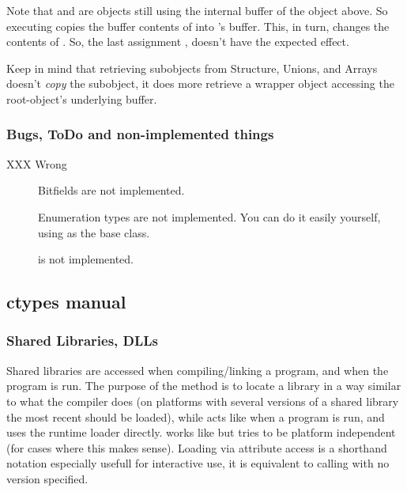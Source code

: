 Note that  and  are objects still using the internal
buffer of the  object above. So executing 
copies the buffer contents of  into  's buffer.  This,
in turn, changes the contents of . So, the last assignment
, doesn't have the expected effect.

Keep in mind that retrieving subobjects from Structure, Unions, and
Arrays doesn't \emph{copy} the subobject, it does more retrieve a wrapper
object accessing the root-object's underlying buffer.


\subsubsection{Bugs, ToDo and non-implemented things\label{ctypes-bugs-todo-non-implemented-things}}
\begin{description}
\item[{XXX Wrong}] 
Bitfields are not implemented.

Enumeration types are not implemented. You can do it easily
yourself, using  as the base class.

 is not implemented.
\end{description}


\subsection{ctypes manual\label{ctypes-ctypes-manual}}


\subsubsection{Shared Libraries, DLLs\label{ctypes-shared-libraries-dlls}}

Shared libraries are accessed when compiling/linking a program, and
when the program is run. The purpose of the  method is to
locate a library in a way similar to what the compiler does (on
platforms with several versions of a shared library the most recent
should be loaded), while  acts like when a program is run, and
uses the runtime loader directly.  works like 
but tries to be platform independent (for cases where this makes
sense). Loading via attribute access is a shorthand notation
especially usefull for interactive use, it is equivalent to calling
 with no version specified.


